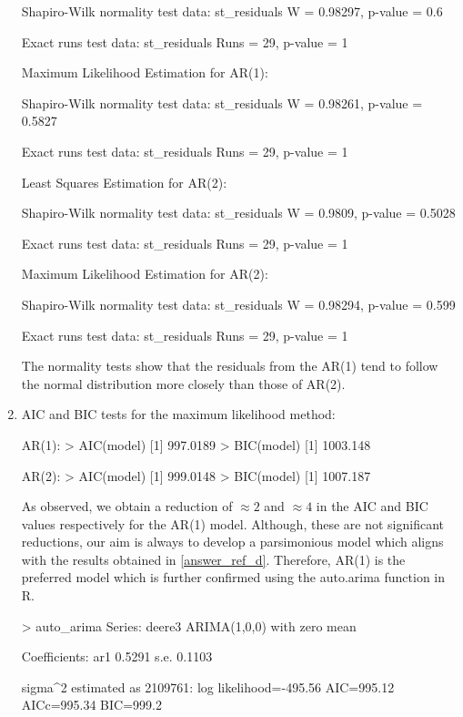 \begin{enumerate}[label=(\alph*)]
\begin{block}
Shapiro-Wilk normality test
data:  st_residuals
W = 0.98297, p-value = 0.6

Exact runs test
data:  st_residuals
Runs = 29, p-value = 1

Maximum Likelihood Estimation for AR(1):

Shapiro-Wilk normality test
data:  st_residuals
W = 0.98261, p-value = 0.5827

Exact runs test
data:  st_residuals
Runs = 29, p-value = 1

Least Squares Estimation for AR(2):

Shapiro-Wilk normality test
data:  st_residuals
W = 0.9809, p-value = 0.5028

Exact runs test
data:  st_residuals
Runs = 29, p-value = 1

Maximum Likelihood Estimation for AR(2):

Shapiro-Wilk normality test
data:  st_residuals
W = 0.98294, p-value = 0.599

Exact runs test
data:  st_residuals
Runs = 29, p-value = 1
\end{block}
\normalsize The normality tests show that the residuals from the AR(1) tend to follow the normal distribution more closely than those of AR(2).
\item AIC and BIC tests for the maximum likelihood method: \small\begin{block}
AR(1):
> AIC(model)
[1] 997.0189
> BIC(model)
[1] 1003.148

AR(2):
> AIC(model)
[1] 999.0148
> BIC(model)
[1] 1007.187
\end{block}
\normalsize As observed, we obtain a reduction of $\approx 2$ and $\approx 4$ in the AIC and BIC values respectively for the AR(1) model. Although, these are not significant reductions, our aim is always to develop a parsimonious model which aligns with the results obtained in \ref{answer_ref_d}. Therefore, AR(1) is the preferred model which is further confirmed using the auto.arima function in R.
\small\begin{block}
> auto_arima
Series: deere3 
ARIMA(1,0,0) with zero mean 

Coefficients:
         ar1
      0.5291
s.e.  0.1103

sigma^2 estimated as 2109761:  log likelihood=-495.56
AIC=995.12   AICc=995.34   BIC=999.2
\end{block}
\end{enumerate}